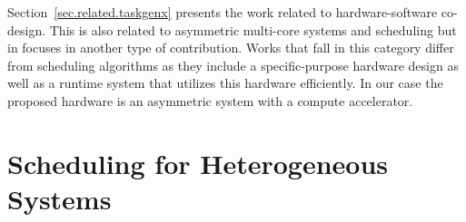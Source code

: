 Section~\ref{sec.related.taskgenx} presents the work related to hardware-software co-design. 
This is also related to asymmetric multi-core systems and scheduling but in focuses in another type of contribution.
Works that fall in this category differ from scheduling algorithms as they include a specific-purpose hardware design as well as a runtime system that utilizes this hardware efficiently.
In our case the proposed hardware is an asymmetric system with a compute accelerator.




\newpage
















\section{Scheduling for Heterogeneous Systems}
\label{sec.related.scheduling}



